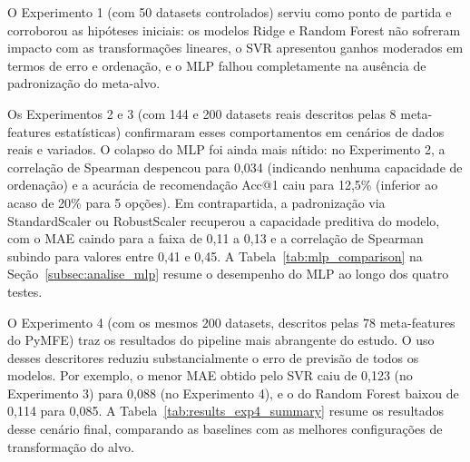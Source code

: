 \documentclass[12pt]{article}
\begin{document}
O Experimento 1 (com 50 datasets controlados) serviu como ponto de partida e corroborou as hipóteses iniciais: os modelos Ridge e Random Forest não sofreram impacto com as transformações lineares, o SVR apresentou ganhos moderados em termos de erro e ordenação, e o MLP falhou completamente na ausência de padronização do meta-alvo.

Os Experimentos 2 e 3 (com 144 e 200 datasets reais descritos pelas 8 meta-features estatísticas) confirmaram esses comportamentos em cenários de dados reais e variados. O colapso do MLP foi ainda mais nítido: no Experimento 2, a correlação de Spearman despencou para 0,034 (indicando nenhuma capacidade de ordenação) e a acurácia de recomendação Acc@1 caiu para 12,5\% (inferior ao acaso de 20\% para 5 opções). Em contrapartida, a padronização via StandardScaler ou RobustScaler recuperou a capacidade preditiva do modelo, com o MAE caindo para a faixa de 0,11 a 0,13 e a correlação de Spearman subindo para valores entre 0,41 e 0,45. A Tabela~\ref{tab:mlp_comparison} na Seção~\ref{subsec:analise_mlp} resume o desempenho do MLP ao longo dos quatro testes.

O Experimento 4 (com os mesmos 200 datasets, descritos pelas 78 meta-features do PyMFE) traz os resultados do pipeline mais abrangente do estudo. O uso desses descritores reduziu substancialmente o erro de previsão de todos os modelos. Por exemplo, o menor MAE obtido pelo SVR caiu de 0,123 (no Experimento 3) para 0,088 (no Experimento 4), e o do Random Forest baixou de 0,114 para 0,085. A Tabela~\ref{tab:results_exp4_summary} resume os resultados desse cenário final, comparando as baselines com as melhores configurações de transformação do alvo.
\end{document}
